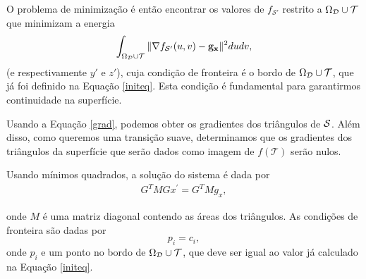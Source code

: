 O problema de minimização é então encontrar os valores de $f_{\mathcal{S}'}$ restrito a $\Omega_{\mathcal{D}} \cup \mathcal{T}$ que minimizam a energia
$$\int_{\Omega_{\mathcal{D}} \cup \mathcal{T}} \| \nabla f_{\mathcal{S}'}(u,v) - \mathbf{g_x}\|^2 dudv,$$
(e respectivamente $y'$ e $z'$), cuja condição de fronteira é o bordo de $\Omega_{\mathcal{D}} \cup \mathcal{T}$, que já foi definido na Equação \ref{initeq}. Esta condição é fundamental para garantirmos continuidade na superfície. 

Usando a Equação \ref{grad}, podemos obter os gradientes dos triângulos de $\mathcal{S}$. Além disso, como queremos uma transição suave, determinamos que os gradientes dos triângulos da superfície que serão dados como imagem de $f(\mathcal{T})$ serão nulos. 

Usando mínimos quadrados, a solução do sistema é dada por
\begin{eqnarray}
G^{T}MGx^{'} = G^{T}Mg_{x},
\end{eqnarray}

onde $M$ é uma matriz diagonal contendo as áreas dos triângulos. As condições de fronteira são dadas por 
$$p_i=c_i,$$
onde $p_i$ e um ponto no bordo de $\Omega_{\mathcal{D}} \cup \mathcal{T}$, que deve ser igual ao valor já calculado na Equação \ref{initeq}.

